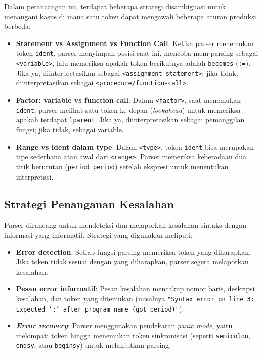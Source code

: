 ﻿\documentclass[12pt,a4paper]{article}
\begin{document}
Dalam perancangan ini, terdapat beberapa strategi disambiguasi untuk menangani kasus di mana satu token dapat mengawali beberapa aturan produksi berbeda:
\begin{itemize}
    \item \textbf{Statement vs Assignment vs Function Call}: Ketika parser menemukan token \texttt{ident}, parser menyimpan posisi saat ini, mencoba mem-parsing sebagai \texttt{<variable>}, lalu memeriksa apakah token berikutnya adalah \texttt{becomes} (\texttt{:=}). Jika ya, diinterpretasikan sebagai \texttt{<assignment-statement>}; jika tidak, diinterpretasikan sebagai \texttt{<procedure/function-call>}.
    \item \textbf{Factor: variable vs function call}: Dalam \texttt{<factor>}, saat menemukan \texttt{ident}, parser melihat satu token ke depan (\textit{lookahead}) untuk memeriksa apakah terdapat \texttt{lparent}. Jika ya, diinterpretasikan sebagai pemanggilan fungsi; jika tidak, sebagai variable.
    \item \textbf{Range vs ident dalam type}: Dalam \texttt{<type>}, token \texttt{ident} bisa merupakan tipe sederhana atau awal dari \texttt{<range>}. Parser memeriksa keberadaan dua titik berurutan (\texttt{period period}) setelah ekspresi untuk menentukan interpretasi.
\end{itemize}

\subsection{Strategi Penanganan Kesalahan}

Parser dirancang untuk mendeteksi dan melaporkan kesalahan sintaks dengan informasi yang informatif. Strategi yang digunakan meliputi:
\begin{itemize}
    \item \textbf{Error detection}: Setiap fungsi parsing memeriksa token yang diharapkan. Jika token tidak sesuai dengan yang diharapkan, parser segera melaporkan kesalahan.
    \item \textbf{Pesan error informatif}: Pesan kesalahan mencakup nomor baris, deskripsi kesalahan, dan token yang ditemukan (misalnya \texttt{"Syntax error on line 3: Expected ';' after program name (got period)"}).
    \item \textbf{\textit{Error recovery}}: Parser menggunakan pendekatan \textit{panic mode}, yaitu melompati token hingga menemukan token sinkronisasi (seperti \texttt{semicolon}, \texttt{endsy}, atau \texttt{beginsy}) untuk melanjutkan parsing.
\end{itemize}
\end{document}
